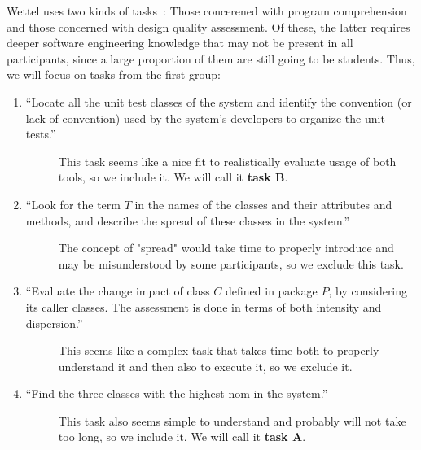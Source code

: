 \documentclass[../thesis]{subfiles}
\begin{document}
Wettel uses two kinds of tasks~\cite[128--130]{wettel2011}:
Those concerened with program comprehension and those concerned with design quality assessment.
Of these, the latter requires deeper software engineering knowledge that may not be present in all participants, since a large proportion of them are still going to be students.
Thus, we will focus on tasks from the first group:
\begin{enumerate}
	\item \enquote{Locate all the unit test classes of the system and identify the convention (or lack of convention) used by the system’s developers to organize the unit tests.}
	      \begin{description}
		      \item[\follows{}] This task seems like a nice fit to realistically evaluate usage of both tools, so we include it.
		            We will call it \textbf{task $\bm{B}$}.
	      \end{description}
	\item \enquote{Look for the term $T$ in the names of the classes and their attributes and methods, and describe the spread of these classes in the system.}
	      \begin{description}
		      \item[\follows{}] The concept of "spread" would take time to properly introduce and may be misunderstood by some participants, so we exclude this task.
	      \end{description}
	\item \enquote{Evaluate the change impact of class $C$ defined in package $P$, by considering its caller classes. The assessment is done in terms of both intensity and dispersion.}
	      \begin{description}
		      \item[\follows{}] This seems like a complex task that takes time both to properly understand it and then also to execute it, so we exclude it.
	      \end{description}
	\item \enquote{Find the three classes with the highest \gls{nom} in the system.}
	      \begin{description}
		      \item[\follows{}] This task also seems simple to understand and probably will not take too long, so we include it.
		            We will call it \textbf{task $\bm{A}$}.
	      \end{description}
\end{enumerate}
\end{document}
